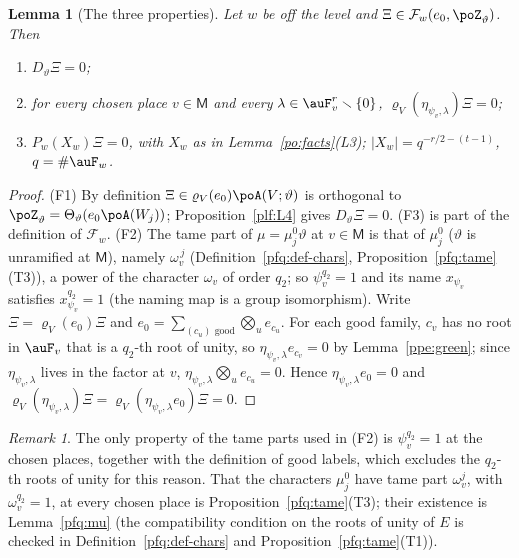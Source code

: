 \documentclass[10pt]{amsart}
\newtheorem{lemma}[theorem]{Lemma}
\theoremstyle{definition}
\theoremstyle{remark}
\newtheorem{remark}[theorem]{Remark}
\begin{document}
\begin{lemma}[The three properties]\label{ppe:three}
Let $w$ be off the level and $\Xi\in\mathcal F_w(e_0,\poZ_\vartheta)$. Then
\begin{enumerate}
\item[(F1)] $D_\vartheta\Xi=0$;
\item[(F2)] for every chosen place $v\in\mathsf M$ and every $\lambda\in\auF_v^r\smallsetminus
\{0\}$, $\varrho_V(\eta_{\psi_v,\lambda})\Xi=0$;
\item[(F3)] $P_w(X_w)\Xi=0$, with $X_w$ as in Lemma~\textup{\ref{po:facts}(L3)}; $|X_w|=
q^{-r/2-(t-1)}$, $q=\#\auF_w$.
\end{enumerate}
\end{lemma}
\begin{proof}
(F1) By definition $\Xi\in\varrho_V(e_0)\poA(V;\vartheta)$ is orthogonal to $\poZ_\vartheta=
\Theta_\vartheta(e_0\poA(W_j))$; Proposition~\ref{plf:L4} gives $D_\vartheta\Xi=0$. (F3) is part of
the definition of $\mathcal F_w$. (F2) The tame part of $\mu=\mu^0_j\vartheta$ at $v\in\mathsf M$ is
that of $\mu^0_j$ ($\vartheta$ is unramified at $\mathsf M$), namely $\omega_v^{\,j}$
(Definition~\ref{pfq:def-chars}, Proposition~\ref{pfq:tame}(T3)), a power of the character $\omega_v$
of order $q_2$; so
$\psi_v^{q_2}=1$ and its name $x_{\psi_v}$ satisfies $x_{\psi_v}^{q_2}=1$ (the naming map is a
group isomorphism). Write $\Xi=\varrho_V(e_0)\Xi$ and $e_0=\sum_{(c_u)\text{ good}}\bigotimes_u
e_{c_u}$. For each good family, $c_v$ has no root in $\auF_v$ that is a $q_2$-th root of unity, so
$\eta_{\psi_v,\lambda}e_{c_v}=0$ by Lemma~\ref{ppe:green}; since $\eta_{\psi_v,\lambda}$ lives in
the factor at $v$, $\eta_{\psi_v,\lambda}\bigotimes_ue_{c_u}=0$. Hence $\eta_{\psi_v,\lambda}e_0=0$
and $\varrho_V(\eta_{\psi_v,\lambda})\Xi=\varrho_V(\eta_{\psi_v,\lambda}e_0)\Xi=0$.
\end{proof}

\begin{remark}\label{ppe:rem-T}
The only property of the tame parts used in (F2) is $\psi_v^{q_2}=1$ at the chosen places, together
with the definition of good labels, which excludes the $q_2$-th roots of unity for this reason. That
the characters $\mu^0_j$ have tame part $\omega_v^j$, with $\omega_v^{q_2}=1$, at every chosen place is
Proposition~\ref{pfq:tame}(T3); their existence is Lemma~\ref{pfq:mu} (the compatibility condition on
the roots of unity of $E$ is checked in Definition~\ref{pfq:def-chars} and Proposition~\ref{pfq:tame}(T1)).
\end{remark}
\end{document}
